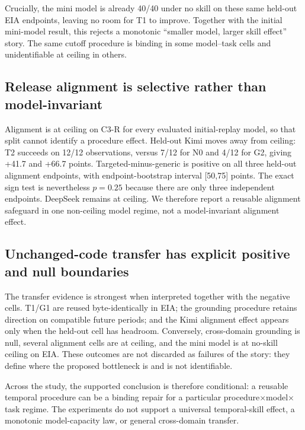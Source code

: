 Crucially, the mini model is already 40/40 under no skill on these same held-out EIA endpoints, leaving no room for T1 to improve. Together with the initial mini-model result, this rejects a monotonic ``smaller model, larger skill effect'' story. The same cutoff procedure is binding in some model--task cells and unidentifiable at ceiling in others.

\subsection{Release alignment is selective rather than model-invariant}
Alignment is at ceiling on C3-R for every evaluated initial-replay model, so that split cannot identify a procedure effect. Held-out Kimi moves away from ceiling: T2 succeeds on 12/12 observations, versus 7/12 for N0 and 4/12 for G2, giving +41.7 and +66.7 points. Targeted-minus-generic is positive on all three held-out alignment endpoints, with endpoint-bootstrap interval [50,75] points. The exact sign test is nevertheless $p=0.25$ because there are only three independent endpoints. DeepSeek remains at ceiling. We therefore report a reusable alignment safeguard in one non-ceiling model regime, not a model-invariant alignment effect.

\subsection{Unchanged-code transfer has explicit positive and null boundaries}
The transfer evidence is strongest when interpreted together with the negative cells. T1/G1 are reused byte-identically in EIA; the grounding procedure retains direction on compatible future periods; and the Kimi alignment effect appears only when the held-out cell has headroom. Conversely, cross-domain grounding is null, several alignment cells are at ceiling, and the mini model is at no-skill ceiling on EIA. These outcomes are not discarded as failures of the story: they define where the proposed bottleneck is and is not identifiable.

Across the study, the supported conclusion is therefore conditional: a reusable temporal procedure can be a binding repair for a particular procedure$\times$model$\times$task regime. The experiments do not support a universal temporal-skill effect, a monotonic model-capacity law, or general cross-domain transfer.
